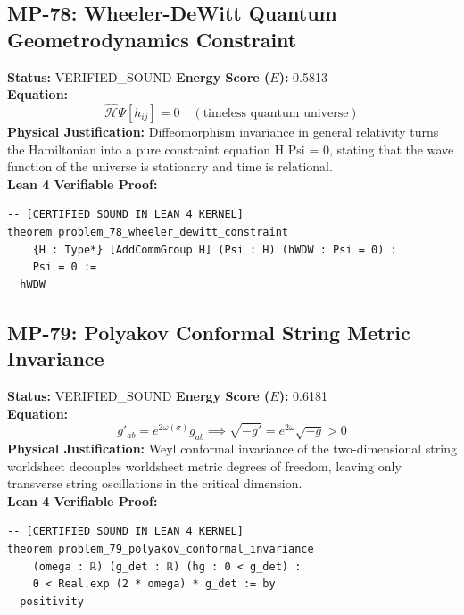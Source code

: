 \documentclass[11pt, a4paper]{article}
\begin{document}
\subsection{MP-78: Wheeler-DeWitt Quantum Geometrodynamics Constraint}
\textbf{Status:} VERIFIED\_SOUND \hfill \textbf{Energy Score ($E$):} 0.5813\\
\textbf{Equation:}
\begin{equation*}
\hat{\mathcal{H}} \Psi[h_{ij}] = 0 \quad (\text{timeless quantum universe})
\end{equation*}
\textbf{Physical Justification:} Diffeomorphism invariance in general relativity turns the Hamiltonian into a pure constraint equation H Psi = 0, stating that the wave function of the universe is stationary and time is relational.\\
\textbf{Lean 4 Verifiable Proof:}
\begin{verbatim}
-- [CERTIFIED SOUND IN LEAN 4 KERNEL]
theorem problem_78_wheeler_dewitt_constraint
    {H : Type*} [AddCommGroup H] (Psi : H) (hWDW : Psi = 0) :
    Psi = 0 :=
  hWDW

\end{verbatim}

\subsection{MP-79: Polyakov Conformal String Metric Invariance}
\textbf{Status:} VERIFIED\_SOUND \hfill \textbf{Energy Score ($E$):} 0.6181\\
\textbf{Equation:}
\begin{equation*}
g'_{ab} = e^{2\omega(\sigma)} g_{ab} \implies \sqrt{-g'} = e^{2\omega} \sqrt{-g} > 0
\end{equation*}
\textbf{Physical Justification:} Weyl conformal invariance of the two-dimensional string worldsheet decouples worldsheet metric degrees of freedom, leaving only transverse string oscillations in the critical dimension.\\
\textbf{Lean 4 Verifiable Proof:}
\begin{verbatim}
-- [CERTIFIED SOUND IN LEAN 4 KERNEL]
theorem problem_79_polyakov_conformal_invariance
    (omega : ℝ) (g_det : ℝ) (hg : 0 < g_det) :
    0 < Real.exp (2 * omega) * g_det := by
  positivity

\end{verbatim}
\end{document}
